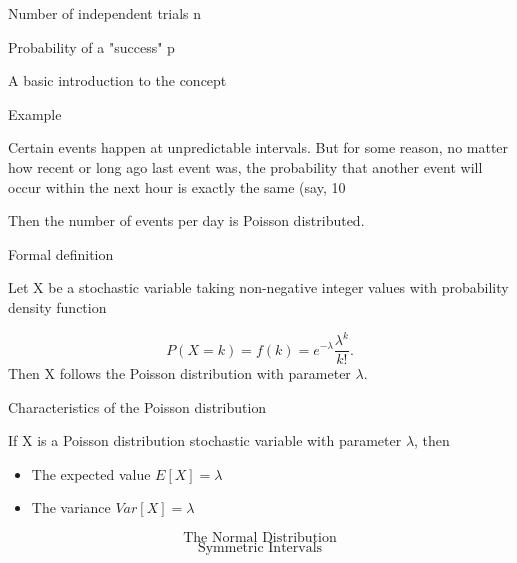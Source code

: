 \documentclass[12pt]{report}
\begin{document}
Number of independent trials    n

Probability of a "success" p













A basic introduction to the concept

Example

Certain events happen at unpredictable intervals. But for some reason, no matter how recent or long ago last event was, the probability that another event will occur within the next hour is exactly the same (say, 10%

Then the number of events per day is Poisson distributed.

Formal definition

Let X be a stochastic variable taking non-negative integer values with probability density function

\[ P(X=k)=f(k)= e^{-\lambda} \frac{\lambda ^k}{k!}.\] 
Then X follows the Poisson distribution with parameter $\lambda$.

Characteristics of the Poisson distribution

If X is a Poisson distribution stochastic variable with parameter $\lambda$, then

\begin{itemize}
	\item The expected value $E[X]=\lambda$
	\item The variance $Var[X]=\lambda$
\end{itemize}





\huge
\[ \mbox{The Normal Distribution} \]
\Large
\[ \mbox{Symmetric Intervals} \]




\end{document}
